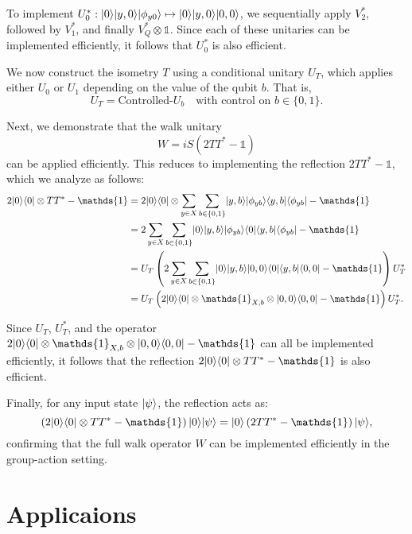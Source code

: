 \documentclass[11pt]{article}
\theoremstyle{definition}
\begin{document}
To implement \( U_0^* : \lvert0\rangle \lvert y, 0\rangle \lvert\phi_{y0}\rangle \mapsto \lvert0\rangle \lvert y, 0\rangle \lvert0, 0\rangle \), we sequentially apply \( V_2^* \), followed by \( V_1^* \), and finally \( V_Q^* \otimes \mathds{1} \). Since each of these unitaries can be implemented efficiently, it follows that \( U_0^* \) is also efficient.

We now construct the isometry \( T \) using a conditional unitary \( U_T \), which applies either \( U_0 \) or \( U_1 \) depending on the value of the qubit \( b \). That is,
\[
U_T = \text{Controlled-}U_b \quad \text{with control on } b \in \{0,1\}.
\]

Next, we demonstrate that the walk unitary
\[
W = iS(2TT^* - \mathds{1})
\]
can be applied efficiently. This reduces to implementing the reflection \( 2TT^* - \mathds{1} \), which we analyze as follows:
\begin{align*}
2\ket{0}\bra{0} \otimes TT^* - \mathds{1}
&= 2\ket{0}\bra{0} \otimes \sum_{y \in X} \sum_{b \in \{0,1\}} \ket{y,b} \ket{\phi_{yb}} \bra{y,b} \bra{\phi_{yb}} - \mathds{1} \\
&= 2\sum_{y \in X} \sum_{b \in \{0,1\}} \ket{0} \ket{y,b} \ket{\phi_{yb}} \bra{0} \bra{y,b} \bra{\phi_{yb}} - \mathds{1} \\
&= U_T \left( 2 \sum_{y \in X} \sum_{b \in \{0,1\}} \ket{0} \ket{y,b} \ket{0,0} \bra{0} \bra{y,b} \bra{0,0} - \mathds{1} \right) U_T^* \\
&= U_T \left( 2\ket{0}\bra{0} \otimes \mathds{1}_{X,b} \otimes \ket{0,0}\bra{0,0} - \mathds{1} \right) U_T^*.
\end{align*}

Since \( U_T \), \( U_T^* \), and the operator \( 2\ket{0}\bra{0} \otimes \mathds{1}_{X,b} \otimes \ket{0,0}\bra{0,0} - \mathds{1} \) can all be implemented efficiently, it follows that the reflection \( 2\ket{0}\bra{0} \otimes TT^* - \mathds{1} \) is also efficient.

Finally, for any input state \( \lvert\psi\rangle \), the reflection acts as:
\[
\left(2\ket{0}\bra{0} \otimes TT^* - \mathds{1} \right) \ket{0} \ket{\psi} = \ket{0} \left(2TT^* - \mathds{1} \right) \ket{\psi},
\]
confirming that the full walk operator \( W \) can be implemented efficiently in the group-action setting.










\section{Applicaions}
\end{document}
